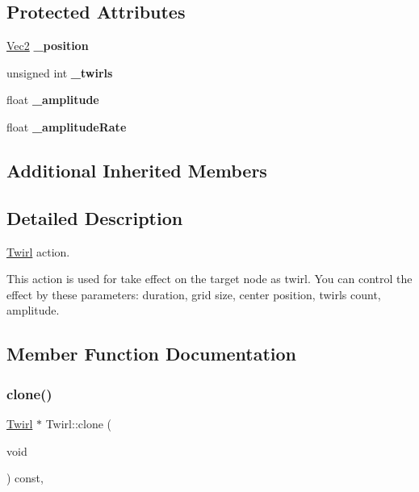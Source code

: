 \subsection*{Protected Attributes}
\begin{DoxyCompactItemize}
\item 
\mbox{\label{classTwirl_a8a8fb754811e393c3fd758640557f6c0}} 
\hyperlink{classVec2}{Vec2} {\bfseries \+\_\+position}
\item 
\mbox{\label{classTwirl_a74b075238ceaf94a34114e72f683b524}} 
unsigned int {\bfseries \+\_\+twirls}
\item 
\mbox{\label{classTwirl_a65941797a7cdf1bc4cb026c5e95f222f}} 
float {\bfseries \+\_\+amplitude}
\item 
\mbox{\label{classTwirl_aceda82e46e9be0818a5a539dd8025cd5}} 
float {\bfseries \+\_\+amplitude\+Rate}
\end{DoxyCompactItemize}
\subsection*{Additional Inherited Members}


\subsection{Detailed Description}
\hyperlink{classTwirl}{Twirl} action. 

This action is used for take effect on the target node as twirl. You can control the effect by these parameters\+: duration, grid size, center position, twirls count, amplitude. 

\subsection{Member Function Documentation}
\mbox{\label{classTwirl_a49ec654e932aa851844dac90fa0cc65c}} 
\subsubsection{\texorpdfstring{clone()}{clone()}\hspace{0.1cm}{\footnotesize\ttfamily [1/2]}}
{\footnotesize\ttfamily \hyperlink{classTwirl}{Twirl} $\ast$ Twirl\+::clone (\begin{DoxyParamCaption}\item[{void}]{ }\end{DoxyParamCaption}) const\hspace{0.3cm}{\ttfamily [override]}, {\ttfamily [virtual]}}

